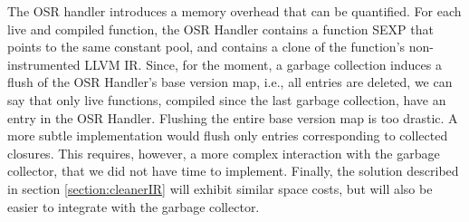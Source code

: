 The OSR handler introduces a memory overhead that can be quantified.
For each live and compiled function, the OSR Handler contains a function SEXP that points to the same constant pool, and contains a clone of the function's non-instrumented LLVM IR.
Since, for the moment, a garbage collection induces a flush of the OSR Handler's base version map, i.e., all entries are deleted, we can say that only live functions, compiled since the last garbage collection, have an entry in the OSR Handler.
Flushing the entire base version map is too drastic. 
A more subtle implementation would flush only entries corresponding to collected closures.
This requires, however, a more complex interaction with the garbage collector, that we did not have time to implement.
Finally, the solution described in section \ref{section:cleanerIR} will exhibit similar space costs, but will also be easier to integrate with the garbage collector.\\
